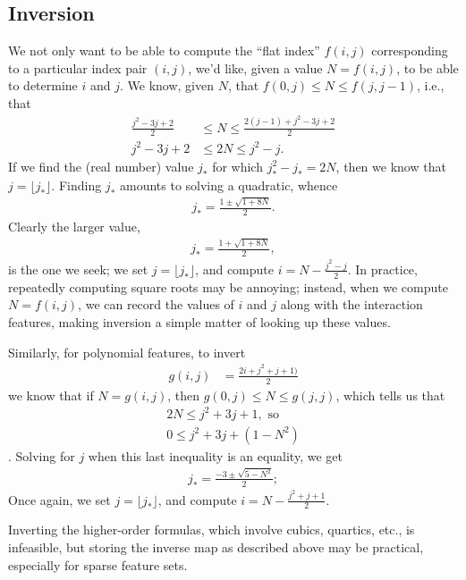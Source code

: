 \documentclass{article} %
\begin{document}
\subsection{Inversion}
We not only want to be able to compute the ``flat index'' $f(i,j)$ corresponding to a particular index pair $(i, j)$, we'd like, given a value $N = f(i, j)$, to be able to determine $i$ and $j$. We know, given $N$, that $f(0, j) \le N \le f(j,j-1)$, i.e., that 
\begin{align}
\frac{j^2 - 3j + 2}{2} &\le N \le \frac{2(j-1) + j^2 - 3j + 2}{2}\\
{j^2 - 3j + 2} &\le 2N \le {j^2 - j}.
\end{align}
If we find the (real number) value $j_{*}$ for which $j_{*}^2 - j_{*} = 2N$, then we know that $j = \lfloor j_{*}\rfloor$. Finding $j_{*}$ amounts to solving a quadratic, whence
\begin{align}
j_{*} = \frac{1 \pm \sqrt{1 + 8N}}{2}.
\end{align}
Clearly the larger value, 
\begin{align}
j_{*} = \frac{1 + \sqrt{1 + 8N}}{2},
\end{align}
is the one we seek; we set $j = \lfloor j_{*}\rfloor$, and compute $i = N - \frac{j^2 - j}{2}$. 
In practice, repeatedly computing square roots may be annoying; instead, when we compute $N = f(i,j)$, we can record the values of $i$ and $j$ along with the interaction features, making inversion a simple matter of looking up these values. 


Similarly, for polynomial features, to invert 
\begin{align}
g(i, j) &=  \frac{2i + j^2 + j + 1)}{2}
\end{align}
we know that if $N = g(i,j)$, then $g(0,j) \le N \le g(j,j)$, which tells us that 
\begin{align}
2N \le j^2 + 3j + 1, \text{ so}\\
0 \le j^2 + 3j + (1-N^2)
\end{align}. 
Solving for $j$ when this last inequality is an equality, we get 
\begin{align}
j_{*} = \frac{-3 \pm \sqrt{ 5 - N^2 }}{2}; 
\end{align}
Once again, we set $j = \lfloor j_{*}\rfloor$, and compute $i = N - \frac{j^2 + j + 1}{2}$. 

Inverting the higher-order formulas, which involve cubics, quartics, etc., is infeasible, but storing the inverse map as described above may be practical, especially for sparse feature sets. 
\end{document}
